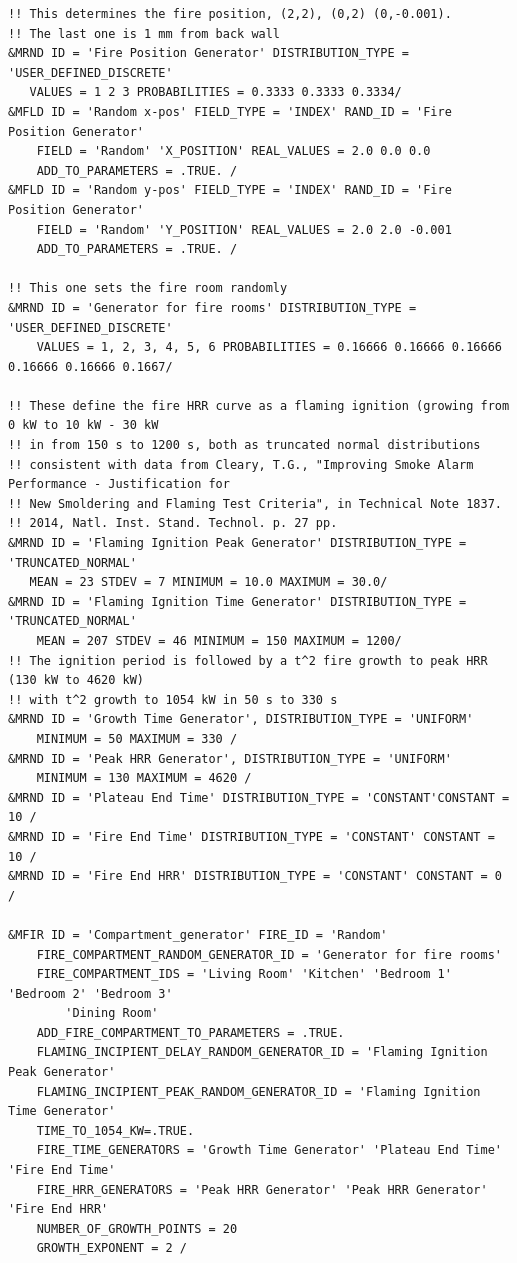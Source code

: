 \documentclass[12pt,twoside]{book}
\begin{document}
\begin{lstlisting}[language=cdata, basicstyle=\scriptsize]
!! This determines the fire position, (2,2), (0,2) (0,-0.001).
!! The last one is 1 mm from back wall
&MRND ID = 'Fire Position Generator' DISTRIBUTION_TYPE = 'USER_DEFINED_DISCRETE'
   VALUES = 1 2 3 PROBABILITIES = 0.3333 0.3333 0.3334/
&MFLD ID = 'Random x-pos' FIELD_TYPE = 'INDEX' RAND_ID = 'Fire Position Generator'
    FIELD = 'Random' 'X_POSITION' REAL_VALUES = 2.0 0.0 0.0
    ADD_TO_PARAMETERS = .TRUE. /
&MFLD ID = 'Random y-pos' FIELD_TYPE = 'INDEX' RAND_ID = 'Fire Position Generator'
    FIELD = 'Random' 'Y_POSITION' REAL_VALUES = 2.0 2.0 -0.001
    ADD_TO_PARAMETERS = .TRUE. /

!! This one sets the fire room randomly
&MRND ID = 'Generator for fire rooms' DISTRIBUTION_TYPE = 'USER_DEFINED_DISCRETE'
    VALUES = 1, 2, 3, 4, 5, 6 PROBABILITIES = 0.16666 0.16666 0.16666 0.16666 0.16666 0.1667/

!! These define the fire HRR curve as a flaming ignition (growing from 0 kW to 10 kW - 30 kW
!! in from 150 s to 1200 s, both as truncated normal distributions
!! consistent with data from Cleary, T.G., "Improving Smoke Alarm Performance - Justification for
!! New Smoldering and Flaming Test Criteria", in Technical Note 1837.
!! 2014, Natl. Inst. Stand. Technol. p. 27 pp.
&MRND ID = 'Flaming Ignition Peak Generator' DISTRIBUTION_TYPE = 'TRUNCATED_NORMAL'
   MEAN = 23 STDEV = 7 MINIMUM = 10.0 MAXIMUM = 30.0/
&MRND ID = 'Flaming Ignition Time Generator' DISTRIBUTION_TYPE = 'TRUNCATED_NORMAL'
    MEAN = 207 STDEV = 46 MINIMUM = 150 MAXIMUM = 1200/
!! The ignition period is followed by a t^2 fire growth to peak HRR (130 kW to 4620 kW)
!! with t^2 growth to 1054 kW in 50 s to 330 s
&MRND ID = 'Growth Time Generator', DISTRIBUTION_TYPE = 'UNIFORM'
    MINIMUM = 50 MAXIMUM = 330 /
&MRND ID = 'Peak HRR Generator', DISTRIBUTION_TYPE = 'UNIFORM'
    MINIMUM = 130 MAXIMUM = 4620 /
&MRND ID = 'Plateau End Time' DISTRIBUTION_TYPE = 'CONSTANT'CONSTANT = 10 /
&MRND ID = 'Fire End Time' DISTRIBUTION_TYPE = 'CONSTANT' CONSTANT = 10 /
&MRND ID = 'Fire End HRR' DISTRIBUTION_TYPE = 'CONSTANT' CONSTANT = 0 /

&MFIR ID = 'Compartment_generator' FIRE_ID = 'Random'
    FIRE_COMPARTMENT_RANDOM_GENERATOR_ID = 'Generator for fire rooms'
    FIRE_COMPARTMENT_IDS = 'Living Room' 'Kitchen' 'Bedroom 1' 'Bedroom 2' 'Bedroom 3'
        'Dining Room'
    ADD_FIRE_COMPARTMENT_TO_PARAMETERS = .TRUE.
    FLAMING_INCIPIENT_DELAY_RANDOM_GENERATOR_ID = 'Flaming Ignition Peak Generator'
    FLAMING_INCIPIENT_PEAK_RANDOM_GENERATOR_ID = 'Flaming Ignition Time Generator'
    TIME_TO_1054_KW=.TRUE.
    FIRE_TIME_GENERATORS = 'Growth Time Generator' 'Plateau End Time' 'Fire End Time'
    FIRE_HRR_GENERATORS = 'Peak HRR Generator' 'Peak HRR Generator' 'Fire End HRR'
    NUMBER_OF_GROWTH_POINTS = 20
    GROWTH_EXPONENT = 2 /
\end{lstlisting}
\end{document}
